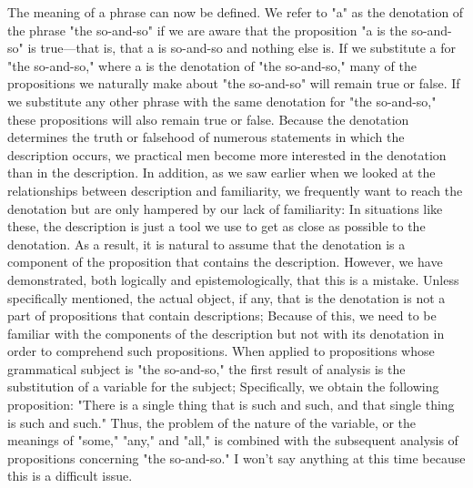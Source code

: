 \documentclass[a4paper,12pt]{book}[2004/02/16]
\theoremstyle{ilemma}
\theoremstyle{itheorem}
\theoremstyle{iother}
\theoremstyle{icorollary}
\theoremstyle{numcorollary}
\theoremstyle{idefinition}
\begin{document}
The meaning of a phrase can now be defined. We refer to "a" as the denotation of the phrase "the so-and-so" if we are aware that the proposition "a is the so-and-so" is true—that is, that a is so-and-so and nothing else is. If we substitute a for "the so-and-so," where a is the denotation of "the so-and-so," many of the propositions we naturally make about "the so-and-so" will remain true or false. If we substitute any other phrase with the same denotation for "the so-and-so," these propositions will also remain true or false. Because the denotation determines the truth or falsehood of numerous statements in which the description occurs, we practical men become more interested in the denotation than in the description. In addition, as we saw earlier when we looked at the relationships between description and familiarity, we frequently want to reach the denotation but are only hampered by our lack of familiarity: In situations like these, the description is just a tool we use to get as close as possible to the denotation. As a result, it is natural to assume that the denotation is a component of the proposition that contains the description. However, we have demonstrated, both logically and epistemologically, that this is a mistake. Unless specifically mentioned, the actual object, if any, that is the denotation is not a part of propositions that contain descriptions;
Because of this, we need to be familiar with the components of the description but not with its denotation in order to comprehend such propositions. When applied to propositions whose grammatical subject is "the so-and-so," the first result of analysis is the substitution of a variable for the subject; Specifically, we obtain the following proposition: "There is a single thing that is such and such, and that single thing is such and such." Thus, the problem of the nature of the variable, or the meanings of "some," "any," and "all," is combined with the subsequent analysis of propositions concerning "the so-and-so." I won't say anything at this time because this is a difficult issue.
\end{document}

